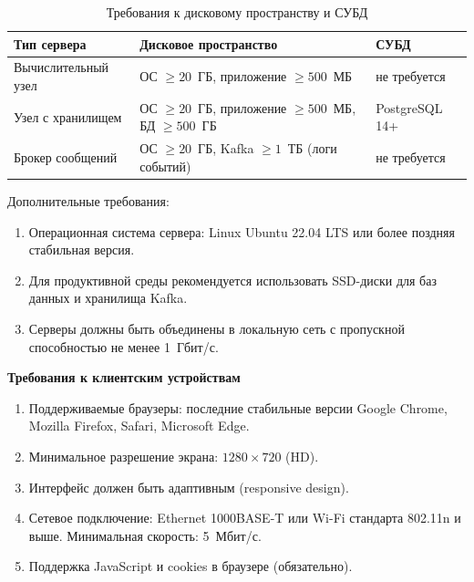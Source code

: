 \documentclass{bmstu}
\begin{document}
\begin{table}[h]
\centering
\caption{Требования к дисковому пространству и СУБД}
\label{tab:storage_requirements}
\begin{tabularx}{\textwidth}{|l|X|X|}
\hline
\textbf{Тип сервера} & \textbf{Дисковое пространство} & \textbf{СУБД} \\
\hline
Вычислительный узел & ОС $\geq 20$~ГБ, приложение $\geq 500$~МБ & не требуется \\
\hline
Узел с хранилищем & ОС $\geq 20$~ГБ, приложение $\geq 500$~МБ, БД $\geq 500$~ГБ & PostgreSQL 14+ \\
\hline
Брокер сообщений & ОС $\geq 20$~ГБ, Kafka $\geq 1$~ТБ (логи событий) & не требуется \\
\hline
\end{tabularx}
\end{table}

Дополнительные требования:

\begin{enumerate}
    \item Операционная система сервера: Linux Ubuntu 22.04 LTS или более поздняя стабильная версия.
    
    \item Для продуктивной среды рекомендуется использовать SSD-диски для баз данных и хранилища Kafka.
    
    \item Серверы должны быть объединены в локальную сеть с пропускной способностью не менее 1~Гбит/с.
\end{enumerate}

\begin{center}
    \textbf{Требования к клиентским устройствам}
\end{center}

\begin{enumerate}
    \item Поддерживаемые браузеры: последние стабильные версии Google Chrome, Mozilla Firefox, Safari, Microsoft Edge.
    
    \item Минимальное разрешение экрана: $1280 \times 720$ (HD).
    
    \item Интерфейс должен быть адаптивным (responsive design).
    
    \item Сетевое подключение: Ethernet 1000BASE-T или Wi-Fi стандарта 802.11n и выше. Минимальная скорость: 5~Мбит/с.
    
    \item Поддержка JavaScript и cookies в браузере (обязательно).
\end{enumerate}
\end{document}
